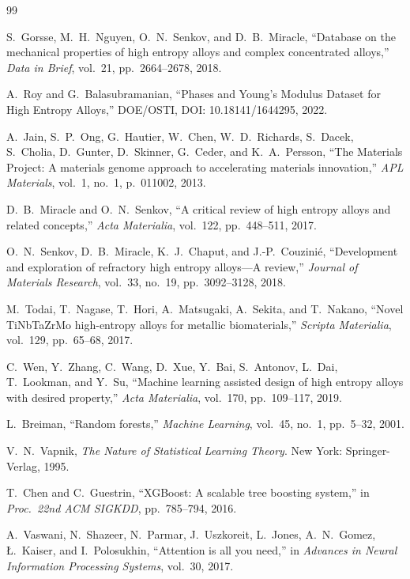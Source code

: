 \documentclass[11pt,a4paper]{article}
\begin{document}
\begin{thebibliography}{99}

S.~Gorsse, M.~H.~Nguyen, O.~N.~Senkov, and D.~B.~Miracle,
``Database on the mechanical properties of high entropy alloys and complex concentrated alloys,'' \emph{Data in Brief}, vol.~21, pp.~2664--2678, 2018.

A.~Roy and G.~Balasubramanian,
``Phases and Young's Modulus Dataset for High Entropy Alloys,'' DOE/OSTI, DOI: 10.18141/1644295, 2022.

A.~Jain, S.~P.~Ong, G.~Hautier, W.~Chen, W.~D.~Richards, S.~Dacek, S.~Cholia, D.~Gunter, D.~Skinner, G.~Ceder, and K.~A.~Persson,
``The Materials Project: A materials genome approach to accelerating materials innovation,'' \emph{APL Materials}, vol.~1, no.~1, p.~011002, 2013.

D.~B.~Miracle and O.~N.~Senkov,
``A critical review of high entropy alloys and related concepts,'' \emph{Acta Materialia}, vol.~122, pp.~448--511, 2017.

O.~N.~Senkov, D.~B.~Miracle, K.~J.~Chaput, and J.-P.~Couzini\'{e},
``Development and exploration of refractory high entropy alloys---A review,'' \emph{Journal of Materials Research}, vol.~33, no.~19, pp.~3092--3128, 2018.

M.~Todai, T.~Nagase, T.~Hori, A.~Matsugaki, A.~Sekita, and T.~Nakano,
``Novel TiNbTaZrMo high-entropy alloys for metallic biomaterials,'' \emph{Scripta Materialia}, vol.~129, pp.~65--68, 2017.

C.~Wen, Y.~Zhang, C.~Wang, D.~Xue, Y.~Bai, S.~Antonov, L.~Dai, T.~Lookman, and Y.~Su,
``Machine learning assisted design of high entropy alloys with desired property,'' \emph{Acta Materialia}, vol.~170, pp.~109--117, 2019.

L.~Breiman,
``Random forests,'' \emph{Machine Learning}, vol.~45, no.~1, pp.~5--32, 2001.

V.~N.~Vapnik,
\emph{The Nature of Statistical Learning Theory}. New York: Springer-Verlag, 1995.

T.~Chen and C.~Guestrin,
``XGBoost: A scalable tree boosting system,'' in \emph{Proc.\ 22nd ACM SIGKDD}, pp.~785--794, 2016.

A.~Vaswani, N.~Shazeer, N.~Parmar, J.~Uszkoreit, L.~Jones, A.~N.~Gomez, \L.~Kaiser, and I.~Polosukhin,
``Attention is all you need,'' in \emph{Advances in Neural Information Processing Systems}, vol.~30, 2017.


\end{thebibliography}
\end{document}
